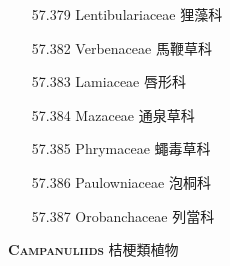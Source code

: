 \begin{enumerate}
\begin{enumerate}
        
      \item[57.379] Lentibulariaceae 狸藻科     
        
      \item[57.382] Verbenaceae 馬鞭草科     
        
      \item[57.383] Lamiaceae 唇形科     
        
      \item[57.384] Mazaceae 通泉草科     
        
      \item[57.385] Phrymaceae 蠅毒草科     
        
      \item[57.386] Paulowniaceae 泡桐科     
        
      \item[57.387] Orobanchaceae 列當科     
        
    \end{enumerate}
\end{enumerate}
\vspace{2ex} 
\noindent \normalsize\textsc{\textbf{Campanuliids} 桔梗類植物}\selectfont \\
\footnotesize\selectfont
